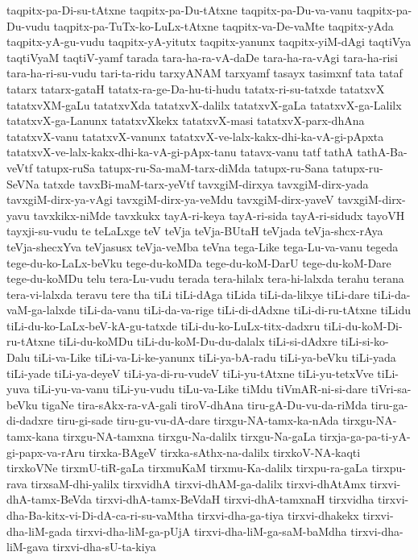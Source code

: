 {taqpitx-pa-Di-su-tAtxne
taqpitx-pa-Du-tAtxne
taqpitx-pa-Du-va-vanu
taqpitx-pa-Du-vudu
taqpitx-pa-TuTx-ko-LuLx-tAtxne
taqpitx-va-De-vaMte
taqpitx-yAda
taqpitx-yA-gu-vudu
taqpitx-yA-yitutx
taqpitx-yanunx
taqpitx-yiM-dAgi
taqtiVya
taqtiVyaM
taqtiV-yamf
tarada
tara-ha-ra-vA-daDe
tara-ha-ra-vAgi
tara-ha-risi
tara-ha-ri-su-vudu
tari-ta-ridu
tarxyANAM
tarxyamf
tasayx
tasimxnf
tata
tataf
tatarx
tatarx-gataH
tatatx-ra-ge-Da-hu-ti-hudu
tatatx-ri-su-tatxde
tatatxvX
tatatxvXM-gaLu
tatatxvXda
tatatxvX-dalilx
tatatxvX-gaLa
tatatxvX-ga-Lalilx
tatatxvX-ga-Lanunx
tatatxvXkekx
tatatxvX-masi
tatatxvX-parx-dhAna
tatatxvX-vanu
tatatxvX-vanunx
tatatxvX-ve-lalx-kakx-dhi-ka-vA-gi-pApxta
tatatxvX-ve-lalx-kakx-dhi-ka-vA-gi-pApx-tanu
tatavx-vanu
tatf
tathA
tathA-Ba-veVtf
tatupx-ruSa
tatupx-ru-Sa-maM-tarx-diMda
tatupx-ru-Sana
tatupx-ru-SeVNa
tatxde
tavxBi-maM-tarx-yeVtf
tavxgiM-dirxya
tavxgiM-dirx-yada
tavxgiM-dirx-ya-vAgi
tavxgiM-dirx-ya-veMdu
tavxgiM-dirx-yaveV
tavxgiM-dirx-yavu
tavxkikx-niMde
tavxkukx
tayA-ri-keya
tayA-ri-sida
tayA-ri-sidudx
tayoVH
tayxji-su-vudu
te
teLaLxge
teV
teVja
teVja-BUtaH
teVjada
teVja-shcx-rAya
teVja-shecxYva
teVjasusx
teVja-veMba
teVna
tega-Like
tega-Lu-va-vanu
tegeda
tege-du-ko-LaLx-beVku
tege-du-koMDa
tege-du-koM-DarU
tege-du-koM-Dare
tege-du-koMDu
telu
tera-Lu-vudu
terada
tera-hilalx
tera-hi-lalxda
terahu
terana
tera-vi-lalxda
teravu
tere
tha
tiLi
tiLi-dAga
tiLida
tiLi-da-lilxye
tiLi-dare
tiLi-da-vaM-ga-lalxde
tiLi-da-vanu
tiLi-da-va-rige
tiLi-di-dAdxne
tiLi-di-ru-tAtxne
tiLidu
tiLi-du-ko-LaLx-beV-kA-gu-tatxde
tiLi-du-ko-LuLx-titx-dadxru
tiLi-du-koM-Di-ru-tAtxne
tiLi-du-koMDu
tiLi-du-koM-Du-du-dalalx
tiLi-si-dAdxre
tiLi-si-ko-Dalu
tiLi-va-Like
tiLi-va-Li-ke-yanunx
tiLi-ya-bA-radu
tiLi-ya-beVku
tiLi-yada
tiLi-yade
tiLi-ya-deyeV
tiLi-ya-di-ru-vudeV
tiLi-yu-tAtxne
tiLi-yu-tetxVve
tiLi-yuva
tiLi-yu-va-vanu
tiLi-yu-vudu
tiLu-va-Like
tiMdu
tiVmAR-ni-si-dare
tiVri-sa-beVku
tigaNe
tira-sAkx-ra-vA-gali
tiroV-dhAna
tiru-gA-Du-vu-da-riMda
tiru-ga-di-dadxre
tiru-gi-sade
tiru-gu-vu-dA-dare
tirxgu-NA-tamx-ka-nAda
tirxgu-NA-tamx-kana
tirxgu-NA-tamxna
tirxgu-Na-dalilx
tirxgu-Na-gaLa
tirxja-ga-pa-ti-yA-gi-papx-va-rAru
tirxka-BAgeV
tirxka-sAthx-na-dalilx
tirxkoV-NA-kaqti
tirxkoVNe
tirxmU-tiR-gaLa
tirxmuKaM
tirxmu-Ka-dalilx
tirxpu-ra-gaLa
tirxpu-rava
tirxsaM-dhi-yalilx
tirxvidhA
tirxvi-dhAM-ga-dalilx
tirxvi-dhAtAmx
tirxvi-dhA-tamx-BeVda
tirxvi-dhA-tamx-BeVdaH
tirxvi-dhA-tamxnaH
tirxvidha
tirxvi-dha-Ba-kitx-vi-Di-dA-ca-ri-su-vaMtha
tirxvi-dha-ga-tiya
tirxvi-dhakekx
tirxvi-dha-liM-gada
tirxvi-dha-liM-ga-pUjA
tirxvi-dha-liM-ga-saM-baMdha
tirxvi-dha-liM-gava
tirxvi-dha-sU-ta-kiya
}
